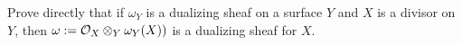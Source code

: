  

\begin{exercise} Prove directly that if $\omega_{Y}$ is a dualizing sheaf on a surface $Y$ and $X$ is a divisor on $Y$, then
$\omega := \cO_{X}\otimes_{Y}\omega_{Y}(X))$ is a dualizing sheaf for $X$.  
\end{exercise}

% 
%
%

